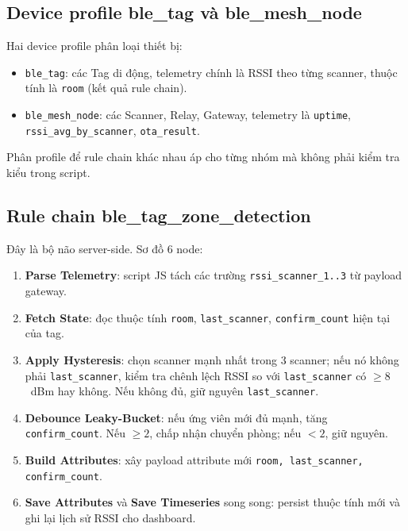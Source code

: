\subsection{Device profile ble\_tag và ble\_mesh\_node}

Hai device profile phân loại thiết bị:

\begin{itemize}
    \item \texttt{ble\_tag}: các Tag di động, telemetry chính là RSSI theo từng scanner, thuộc tính là \texttt{room} (kết quả rule chain).
    \item \texttt{ble\_mesh\_node}: các Scanner, Relay, Gateway, telemetry là \texttt{uptime}, \texttt{rssi\_avg\_by\_scanner}, \texttt{ota\_result}.
\end{itemize}

Phân profile để rule chain khác nhau áp cho từng nhóm mà không phải kiểm tra kiểu trong script.

\subsection{Rule chain ble\_tag\_zone\_detection}

Đây là bộ não server-side. Sơ đồ 6 node:

\begin{enumerate}
    \item \textbf{Parse Telemetry}: script JS tách các trường \texttt{rssi\_scanner\_1..3} từ payload gateway.
    \item \textbf{Fetch State}: đọc thuộc tính \texttt{room}, \texttt{last\_scanner}, \texttt{confirm\_count} hiện tại của tag.
    \item \textbf{Apply Hysteresis}: chọn scanner mạnh nhất trong 3 scanner; nếu nó không phải \texttt{last\_scanner}, kiểm tra chênh lệch RSSI so với \texttt{last\_scanner} có $\geq 8$~dBm hay không. Nếu không đủ, giữ nguyên \texttt{last\_scanner}.
    \item \textbf{Debounce Leaky-Bucket}: nếu ứng viên mới đủ mạnh, tăng \texttt{confirm\_count}. Nếu $\geq 2$, chấp nhận chuyển phòng; nếu $< 2$, giữ nguyên.
    \item \textbf{Build Attributes}: xây payload attribute mới \texttt{{room, last\_scanner, confirm\_count}}.
    \item \textbf{Save Attributes} và \textbf{Save Timeseries} song song: persist thuộc tính mới và ghi lại lịch sử RSSI cho dashboard.
\end{enumerate}

